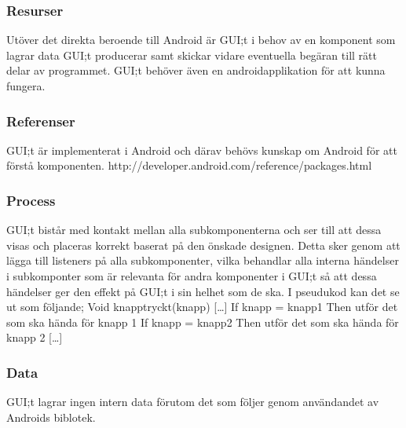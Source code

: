 \subsubsection{Resurser}
Utöver det direkta beroende till Android är GUI;t i behov av en komponent som lagrar data GUI;t producerar samt skickar vidare eventuella begäran till rätt delar av programmet. GUI;t behöver även en androidapplikation för att kunna fungera.

\subsubsection{Referenser}
GUI;t är implementerat i Android och därav behövs kunskap om Android för att förstå komponenten.
http://developer.android.com/reference/packages.html

\subsubsection{Process}
GUI;t bistår med kontakt mellan alla subkomponenterna och ser till att dessa visas och placeras korrekt baserat på den önskade designen. Detta sker genom att lägga till listeners på alla subkomponenter, vilka behandlar alla interna händelser i subkomponter som är relevanta för andra komponenter i GUI;t  så att dessa händelser ger den effekt på GUI;t i sin helhet som de ska. I pseudukod kan det se ut som följande;
Void knapptryckt(knapp)
[…]
If knapp = knapp1
Then utför det som ska hända för knapp 1
If knapp = knapp2
Then utför det som ska hända för knapp 2
[…]

\subsubsection{Data}
GUI;t lagrar ingen intern data förutom det som följer genom användandet av Androids biblotek.
